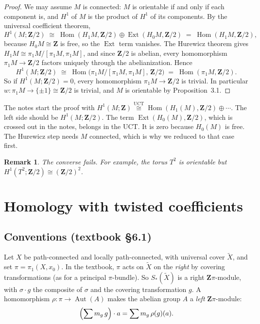 \documentclass[11pt]{article}
\newcommand{\Z}{\mathbf{Z}}
\newcommand{\Xt}{\widetilde{X}}
\newcommand{\Zpi}{\Z\pi}
\DeclareMathOperator{\Hom}{Hom}
\DeclareMathOperator{\Ext}{Ext}
\DeclareMathOperator{\Aut}{Aut}
\newcommand{\iso}{\cong}
\theoremstyle{namedit}
\theoremstyle{namedrm}
\newtheorem{rem}{Remark}
\begin{document}
\begin{proof}
We may assume $M$ is connected: $M$ is orientable if and only if each component is, and $H^1$ of $M$
is the product of $H^1$ of its components. By the universal coefficient theorem,
\[
  H^1(M;\Z/2)\;\iso\;\Hom(H_1M,\Z/2)\oplus\Ext(H_0M,\Z/2)\;=\;\Hom(H_1M,\Z/2),
\]
because $H_0M\iso\Z$ is free, so the $\Ext$ term vanishes. The Hurewicz theorem gives
$H_1M\iso\pi_1M/[\pi_1M,\pi_1M]$, and since $\Z/2$ is abelian, every homomorphism
$\pi_1M\to\Z/2$ factors uniquely through the abelianization. Hence
\[
  H^1(M;\Z/2)\;\iso\;\Hom\bigl(\pi_1M/[\pi_1M,\pi_1M],\,\Z/2\bigr)\;=\;\Hom(\pi_1M,\Z/2).
\]
So if $H^1(M;\Z/2)=0$, every homomorphism $\pi_1M\to\Z/2$ is trivial. In particular
$w\colon\pi_1M\to\{\pm1\}\iso\Z/2$ is trivial, and $M$ is orientable by
Proposition~3.1.
\end{proof}

\begin{correction}[label=c:uct]
The notes start the proof with $H^1(M;\Z)\overset{\text{UCT}}{\iso}\Hom(H_1(M),\Z/2)\oplus\cdots$. The
left side should be $H^1(M;\Z/2)$. The term $\Ext(H_0(M),\Z/2)$, which is crossed out in the notes,
belongs in the UCT. It is zero because $H_0(M)$ is free. The Hurewicz step needs $M$ connected, which
is why we reduced to that case first.
\end{correction}

\begin{rem}
The converse fails. For example, the torus $T^2$ is orientable but $H^1(T^2;\Z/2)\iso(\Z/2)^2$.
\end{rem}

\section{Homology with twisted coefficients}

\subsection{Conventions (textbook \S6.1)}
Let $X$ be path-connected and locally path-connected, with universal cover $\Xt$, and set
$\pi=\pi_1(X,x_0)$. In the textbook, $\pi$ acts on $\Xt$ on the \emph{right} by covering
transformations (as for a principal $\pi$-bundle). So $S_*(\Xt)$ is a right $\Zpi$-module, with
$\sigma\cdot g$ the composite of $\sigma$ and the covering transformation $g$. A homomorphism
$\rho\colon\pi\to\Aut(A)$ makes the abelian group $A$ a \emph{left} $\Zpi$-module:
\[
  \Bigl(\sum m_g\,g\Bigr)\cdot a=\sum m_g\,\rho(g)(a).
\]
\end{document}
